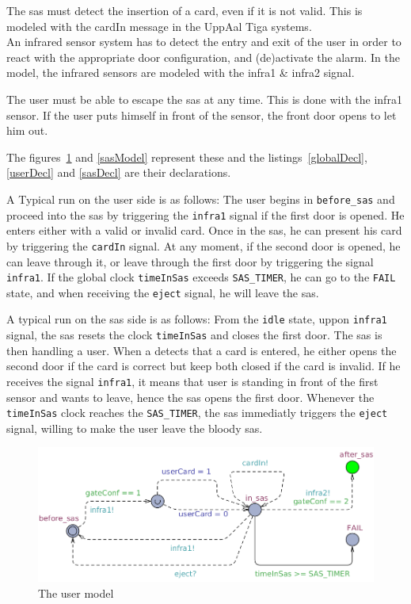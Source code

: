 The sas must detect the insertion of a card, even if it is not valid. This is modeled with the cardIn message in the UppAal Tiga systems.\\

An infrared sensor system has to detect the entry and exit of the user in order to react with the appropriate door configuration, and (de)activate the alarm. In the model, the infrared sensors are modeled with the infra1 \& infra2 signal.

The user must be able to escape the sas at any time. This is done with the infra1 sensor. If the user puts himself in front of the sensor, the front door opens to let him out.

The figures~\ref{userModel} and \ref{sasModel} represent these and the listings~\ref{globalDecl}, \ref{userDecl} and \ref{sasDecl} are their declarations.

A Typical run on the user side is as follows: The user begins in \texttt{before\_sas} and proceed into the sas by triggering the \texttt{infra1} signal if the first door is opened. He enters either with a valid or invalid card.
Once in the sas, he can present his card by triggering the \texttt{cardIn} signal.
At any moment, if the second door is opened, he can leave through it, or leave through the first door by triggering the signal \texttt{infra1}.
If the global clock \texttt{timeInSas} exceeds \texttt{SAS\_TIMER}, he can go to the \texttt{FAIL} state, and when receiving the \texttt{eject} signal, he will leave the sas.

A typical run on the sas side is as follows: From the \texttt{idle} state, uppon \texttt{infra1} signal, the sas resets the clock \texttt{timeInSas} and closes the first door. 
The sas is then handling a user. 
When a detects that a card is entered, he either opens the second door if the card is correct but keep both closed if the card is invalid.
If he receives the signal \texttt{infra1}, it means that user is standing in front of the first sensor and wants to leave, hence the sas opens the first door.
Whenever the \texttt{timeInSas} clock reaches the \texttt{SAS\_TIMER}, the sas immediatly triggers the \texttt{eject} signal, willing to make the user leave the bloody sas.


\begin{figure}[!h]
	\centering
    \includegraphics[width=\textwidth]{User_model.png}
    \caption{The user model}
    \label{userModel}
\end{figure}

